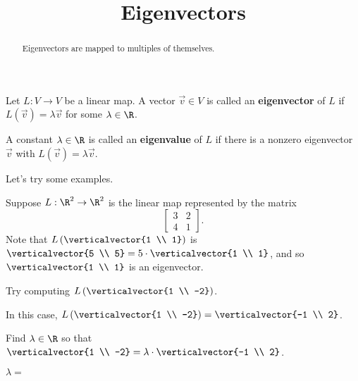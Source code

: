 \documentclass{ximera}
\title{Eigenvectors}
\begin{document}
\begin{abstract}
  Eigenvectors are mapped to multiples of themselves.
\end{abstract}

\begin{definition}
  Let $L:V \to V$ be a linear map.  A vector $\vec{v} \in V$ is called
  an \textbf{eigenvector} of $L$ if $L(\vec{v}) = \lambda \vec{v}$ for
  some $\lambda \in \R$.

  A constant $\lambda \in \R$ is called an \textbf{eigenvalue} of $L$
  if there is a nonzero eigenvector $\vec{v}$ with $L(\vec{v}) =
  \lambda \vec{v}$.
\end{definition}

Let's try some examples.

\begin{question}
  Suppose $L : \R^2 \to \R^2$ is the linear map represented by the matrix
  $$
  \begin{bmatrix}
    3 & 2 \\
    4 & 1
  \end{bmatrix}.
  $$
  Note that $L\left( \verticalvector{1 \\ 1} \right)$ is
  $\verticalvector{5 \\ 5} = 5 \cdot \verticalvector{1 \\ 1}$, and so
  $\verticalvector{1 \\ 1}$ is an eigenvector.

  \begin{solution}
    \begin{hint}
      Try computing $L\left( \verticalvector{1 \\ -2} \right)$.
    \end{hint}

    \begin{hint}
      In this case, $L\left( \verticalvector{1 \\ -2} \right) = \verticalvector{-1 \\ 2}$.
    \end{hint}

    \begin{hint}
      \begin{question}
        Find $\lambda \in \R$ so that $\verticalvector{1 \\ -2} = \lambda \cdot \verticalvector{-1 \\ 2}$.
        \begin{solution}
          $\lambda = $ 
        \end{solution}


\end{question}
\end{hint}
\end{solution}
\end{question}
\end{document}
